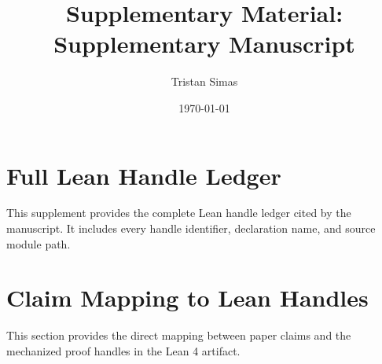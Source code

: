 \documentclass[11pt]{article}
\providecommand{\PaperTitleAuto}{Supplementary Manuscript}
\begin{document}
\title{Supplementary Material: \PaperTitleAuto}
\author{Tristan Simas}
\date{\today}
\maketitle

\section{Full Lean Handle Ledger}

This supplement provides the complete Lean handle ledger cited by the manuscript.
It includes every handle identifier, declaration name, and source module path.


\vfill
\newpage

\section{Claim Mapping to Lean Handles}

This section provides the direct mapping between paper claims and the mechanized proof handles in the Lean 4 artifact.

\end{document}
